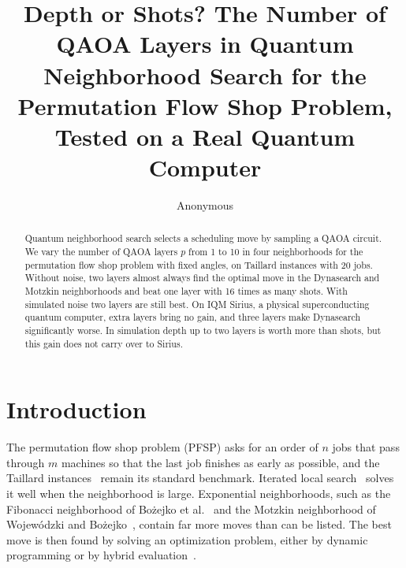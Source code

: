 \documentclass[runningheads]{llncs}
\begin{document}
\title{Depth or Shots? The Number of QAOA Layers in Quantum Neighborhood
Search for the Permutation Flow Shop Problem, Tested on a Real Quantum
Computer}
\author{Anonymous}
\maketitle

\begin{abstract}
Quantum neighborhood search selects a scheduling move by sampling a QAOA
circuit. We vary the number of QAOA layers $p$ from 1 to 10 in four
neighborhoods for the permutation flow shop problem with fixed angles, on
Taillard instances with 20 jobs. Without noise, two layers almost always find
the optimal move in the Dynasearch and Motzkin neighborhoods and beat one
layer with 16 times as many shots. With simulated noise two layers are still
best. On IQM Sirius, a physical superconducting quantum computer, extra layers
bring no gain, and three layers make Dynasearch significantly worse. In
simulation depth up to two layers is worth more than shots, but this gain
does not carry over to Sirius.
\end{abstract}

\section{Introduction}

The permutation flow shop problem (PFSP) asks for an order of $n$ jobs that
pass through $m$ machines so that the last job finishes as early as possible,
and the Taillard instances~\cite{taillard1993} remain its standard benchmark.
Iterated local search~\cite{lourenco2003} solves it well when the
neighborhood is large. Exponential neighborhoods, such as the Fibonacci
neighborhood of Bo\.{z}ejko et al.~\cite{bozejko2026new} and the Motzkin
neighborhood of Wojew\'{o}dzki and
Bo\.{z}ejko~\cite{wojewodzki2026soco,wojewodzki2025exit}, contain far more
moves than can be listed. The best move is then found by solving an
optimization problem, either by dynamic programming or by hybrid
evaluation~\cite{wojewodzki2026icaisc}.
\end{document}
